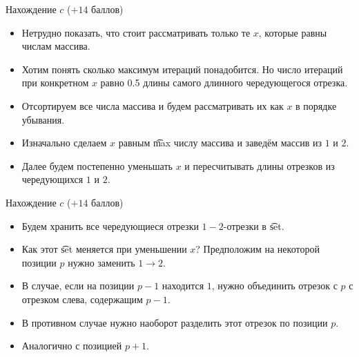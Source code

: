 
\begin{frame}{Нахождение $c$ ($+14$ баллов)}
  \begin{itemize}
  \item Нетрудно показать, что стоит рассматривать только те $x$, которые равны числам массива.
  \item Хотим понять сколько максимум итераций понадобится. Но число итераций при конкретном $x$ равно 0.5 длины
    самого длинного чередующегося отрезка.
  \item Отсортируем все числа массива и будем рассматривать их как $x$ в порядке убывания.
  \item Изначально сделаем $x$ равным \t{max} числу массива и заведём массив из $1$ и $2$.
  \item Далее будем постепенно уменьшать $x$ и пересчитывать длины отрезков из чередующихся $1$ и $2$.
  \end{itemize}
\end{frame}

\begin{frame}{Нахождение $c$ ($+14$ баллов)}
  \begin{itemize}
  \item Будем хранить все чередующиеся отрезки $1-2$-отрезки в \t{set}.
  \item Как этот \t{set} меняется при уменьшении $x$? Предположим на некоторой позиции $p$ нужно заменить $1 \to 2$.
  \item В случае, если на позиции $p - 1$ находится $1$, нужно объединить отрезок с $p$ с отрезком слева, содержащим $p - 1$.
  \item В противном случае нужно наоборот разделить этот отрезок по позиции $p$.
  \item Аналогично с позицией $p + 1$.
  \end{itemize}
\end{frame}

